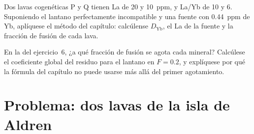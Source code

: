 \begin{exercise}[$\star\star\star$]\label{exo:b3:trace-element-modelling:11}
Dos lavas cogenéticas P y Q tienen La de 20 y \qty{10}{ppm}, y La/Yb de 10 y 6.
Suponiendo el lantano perfectamente incompatible y una fuente con
\qty{0.44}{ppm} de Yb, aplíquese el método del capítulo: calcúlense $D_{\mathrm{Yb}}$,
el La de la fuente y la fracción de fusión de cada lava.
\end{exercise}

\begin{exercise}[$\star\star\star$]\label{exo:b3:trace-element-modelling:12}
En la  del ejercicio~6, ¿a qué fracción de fusión
se agota cada mineral? Calcúlese el coeficiente global del residuo para el lantano en
$F = 0.2$, y explíquese por qué la fórmula del capítulo no puede usarse más allá del
primer agotamiento.
\end{exercise}

\section{Problema: dos lavas de la isla de Aldren}

